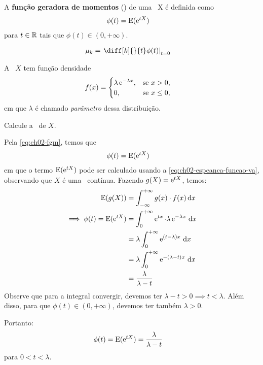 \begin{definition}
    A \textbf{função geradora de momentos} (\fgm)
    de uma \va\ X é definida como
    \begin{align}
        \phi(t) &= \operatorname{E}(\operatorname{e}^{tX}) \label{eq:ch02-fgm}
    \end{align}
    para $t \in \operatorname{\mathbb{R}}$ tais que $\phi(t) \in (0, +\infty)$.
\end{definition}

\begin{result}
    \begin{align}
        \mu_k &= \left.\diff[k]{}{t} \phi(t) \right|_{t=0}
    \end{align}
\end{result}

\begin{example}\label{exp:ch02-fgm-exponencial}
    A \va\ $X$ tem função densidade
    \begin{align*}
        f(x) &= \begin{cases}
            \lambda \operatorname{e}^{-\lambda x}, & \text{se } x > 0, \\
            0, & \text{se } x \leq 0,
        \end{cases}
    \end{align*}
    em que $\lambda$ é chamado \textit{parâmetro}
    dessa distribuição.

    Calcule a \fgm\ de $X$.

    \bigskip
    Pela \cref{eq:ch02-fgm}, temos que
    \begin{align*}
        \phi(t) &= \operatorname{E}(\operatorname{e}^{tX})
    \end{align*}
    em que o termo $\operatorname{E}(\operatorname{e}^{tX})$ pode ser
    calculado usando a \cref{eq:ch02-espeanca-funcao-va},
    observando que $X$ é uma \va\ contínua.
    Fazendo $g(X) = \operatorname{e}^{tX}$, temos:
    \begin{align*}
        \operatorname{E}(g(X))
        &= \int_{-\infty}^{+\infty} g(x) \cdot f(x) \,\mathrm{d} x \\
        \implies \phi(t) = \operatorname{E}(\operatorname{e}^{tX})
        &= \int_0^{+\infty} \operatorname{e}^{tx}
            \cdot \lambda \operatorname{e}^{-\lambda x} \,\mathrm{d} x \\
        &= \lambda \int_0^{+\infty}
                \operatorname{e}^{(t-\lambda) x} \,\mathrm{d} x \\
        &= \lambda \int_0^{+\infty}
                \operatorname{e}^{-(\lambda - t) x} \,\mathrm{d} x \\
        &= \frac{\lambda}{\lambda - t}
    \end{align*}
    Observe que para a integral convergir, devemos ter
    $\lambda - t > 0 \implies t < \lambda$.
    Além disso, para que $\phi(t) \in (0, +\infty)$,
    devemos ter também $\lambda > 0$.

    \bigskip
    Portanto:
    \begin{align*}
        \phi(t) = \operatorname{E}(\operatorname{e}^{tX})
        &= \frac{\lambda}{\lambda - t}
    \end{align*}
    para $0 < t < \lambda$.
\end{example}

